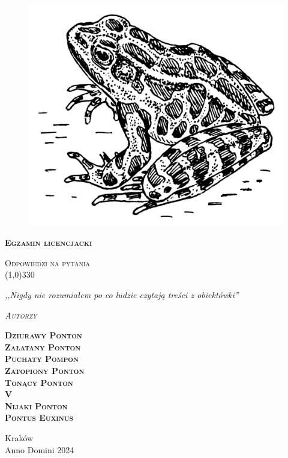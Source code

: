 \begin{titlepage}
	\begin{center}
		\begin{figure}[H]
			\centering
			\includegraphics[scale=1]{img/Frog_(PSF).png}

		\end{figure}

		\Huge
		\textbf{\textsc{Egzamin licencjacki}}

		\vspace{0.5cm}
		\Large
		\textsc{Odpowiedzi na pytania} \\
		\line(1,0){330}

		\normalsize
		\textit{,,Nigdy nie rozumiałem po co ludzie czytają treści z obiektówki''}
		\vspace{1cm}

		\textit{\textsc{Autorzy}}\\
		\vspace{5mm}

		\textbf{\textsc{Dziurawy Ponton} \\ \textsc{Załatany Ponton} \\ \textsc{Puchaty Pompon} \\ \textsc{Zatopiony Ponton} \\ \textsc{Tonący Ponton}\\ \textsc{V} \\ \textsc{Nijaki Ponton} \\ \textsc{Pontus Euxinus}} \\

		\vfill

		Kraków \\
		Anno Domini 2024
	\end{center}
\end{titlepage}